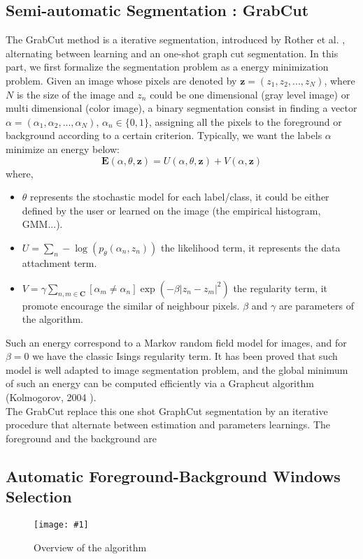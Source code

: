 \documentclass[runningheads]{llncs}
\newcommand{\insertF}[4]{
  \begin{figure}[h!]
    \centering
    \begin{minipage}{#3\linewidth}
    \texttt{[image: \#1]}
    \end{minipage}  
      \caption{#2}
      \label{#4}
  \end{figure}  
}
\newcommand{\bfE}{\mathbf{E}}
\newcommand{\bfz}{\mathbf{z}}
\begin{document}
\subsection{Semi-automatic Segmentation : GrabCut}
The GrabCut method is a iterative segmentation, introduced by Rother et al. \cite{Rother:2004}, alternating between learning and an one-shot graph cut segmentation. In this part, we  first formalize the segmentation problem as a energy minimization problem. Given an image whose pixels are denoted by $\bfz=(z_1,z_2,...,z_N)$, where $N$ is the size of the image and $z_n$ could be one dimensional (gray level image) or multi dimensional (color image), a binary segmentation consist in finding a vector $\alpha=(\alpha_1,\alpha_2,...,\alpha_N)$, $\alpha_n\in\{0,1\}$, assigning all the pixels to the foreground or background according to a certain criterion. Typically, we want the labels $\alpha$ minimize an energy below:
\begin{equation}
\bfE(\alpha,\theta,\bfz)=U(\alpha,\theta,\bfz)+V(\alpha,\bfz)
\end{equation}
where,
  \begin{itemize}
  \item $\theta$ represents the stochastic model for each label/class, it could be either defined by the user or learned on the image (the empirical histogram, GMM...).
  \item $U=\sum_n -\log(p_\theta (\alpha_n,z_n))$ the likelihood term, it represents the data attachment term. 
  \item $V=\gamma \sum_{n,m\in \mathbf{C}}[\alpha_m \neq \alpha_n] \exp(-\beta|z_n-z_m|^2)$ the regularity term, it promote encourage the similar of neighbour pixels. $\beta$ and $\gamma$ are parameters of the algorithm. 
  \end{itemize}
Such an energy correspond to a Markov random field model for images, and for $\beta=0$ we have the classic Isings regularity term. It has been proved that such model is well adapted to image segmentation problem, and the global minimum of such an energy can be computed efficiently via a Graphcut algorithm (Kolmogorov, 2004 \cite{Kolmogorov:2004}).\\
The GrabCut replace this one shot GraphCut segmentation by an iterative procedure that alternate between estimation and parameters learnings. The foreground and the background are 
\subsection{Automatic Foreground-Background Windows Selection}
\insertF{schema}{Overview of the algorithm}{1}{sch}
\end{document}
